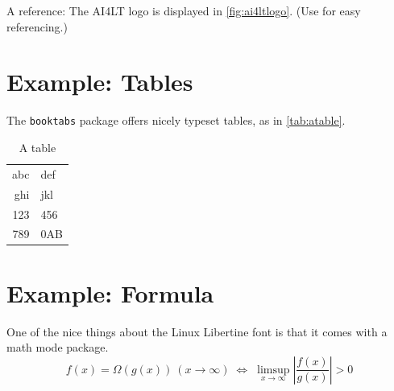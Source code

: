A reference: The AI4LT logo is displayed in \autoref{fig:ai4ltlogo}. 
(Use  for easy referencing.) 

\section{Example: Tables}
The \texttt{booktabs} package offers nicely typeset tables, as in \autoref{tab:atable}.

\label{sec:Introduction:Tables}
\begin{table}
\centering
\begin{tabular}{r l}
\toprule
abc & def\\
ghi & jkl\\
\midrule
123 & 456\\
789 & 0AB\\
\bottomrule
\end{tabular}
\caption{A table}
\label{tab:atable}
\end{table}

\section{Example: Formula}
One of the nice things about the Linux Libertine font is that it comes with
a math mode package.
\begin{displaymath}
f(x)=\Omega(g(x))\ (x\rightarrow\infty)\;\Leftrightarrow\;
\limsup_{x \to \infty} \left|\frac{f(x)}{g(x)}\right|> 0
\end{displaymath}

